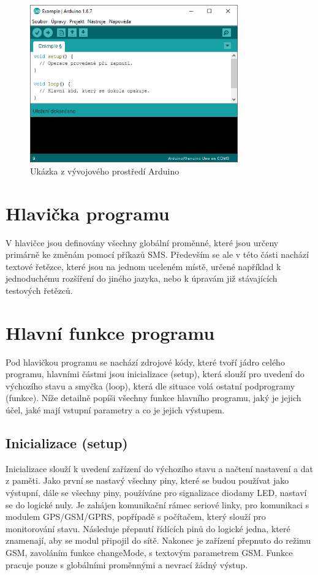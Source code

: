 \documentclass[FM,BP]{tulthesis}  %
\begin{document}
\begin{figure}[H]
\begin{center}
\includegraphics[width=0.8\textwidth]{images/arduino-ide.png}
\caption{Ukázka z vývojového prostředí Arduino}
\label{image}
\end{center}
\end{figure}


\section{Hlavička programu}
V hlavičce jsou definovány všechny globální proměnné, které jsou určeny primárně ke změnám pomocí příkazů SMS. Především se ale v této části nachází textové řetězce, které jsou na jednom uceleném místě, určené například k jednoduchému rozšíření do jiného jazyka, nebo k úpravám již stávajících testových řetězců.

\section{Hlavní funkce programu}
Pod hlavičkou programu se nachází zdrojové kódy, které tvoří jádro celého programu, hlavními částmi jsou inicializace (setup), která slouží pro uvedení do výchozího stavu a smyčka (loop), která dle situace volá ostatní podprogramy (funkce). Níže detailně popíši všechny funkce hlavního programu, jaký je jejich účel, jaké mají vstupní parametry a co je jejich výstupem.

\subsection{Inicializace (setup)}
Inicializace slouží k uvedení zařízení do výchozího stavu a načtení nastavení a dat z paměti. Jako první se nastavý všechny piny, které se budou používat jako výstupní, dále se všechny piny, používáne pro signalizace diodamy LED, nastaví se do logické nuly. Je zahájen komunikační rámec seriové linky, pro komunikaci s modulem GPS/GSM/GPRS, popřípadě s počítačem, který slouží pro monitorování stavu.  Následuje přepnutí řídících pinů do logické jedna, které znamenají, aby se modul připojil do sítě. Nakonec je zařízení přepnuto do režimu GSM, zavoláním funkce changeMode, s textovým parametrem GSM. Funkce pracuje pouze s globálními proměnnými a nevrací žádný výstup.
\end{document}
